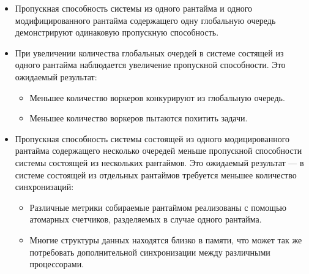 \begin{itemize}
    \item Пропускная способность системы из одного рантайма и одного модифицированного рантайма содержащего одну глобальную очередь демонстрируют одинаковую пропускную способность.
    \item При увеличении количества глобальных очердей в системе состящей из одного рантайма наблюдается увеличение пропускной способности. Это ожидаемый результат:
    \begin{itemize}
        \item Меньшее количество воркеров конкурируют из глобальную очередь.
        \item Меньшее количество воркеров пытаются похитить задачи.
    \end{itemize}
    \item Пропускная способность системы состоящей из одного модицированного рантайма содержащего несколько очередей меньше пропускной способности системы состоящей из нескольких рантаймов. Это ожидаемый результат --- в системе состоящей из отдельных рантаймов требуется меньшее количество синхронизаций:
    \begin{itemize}
        \item Различные метрики собираемые рантаймом реализованы с помощью атомарных счетчиков, разделяемых в случае одного рантайма.
        \item Многие структуры данных находятся близко в памяти, что может так же потребовать дополнительной синхронизации между различными процессорами.
    \end{itemize}
\end{itemize}
